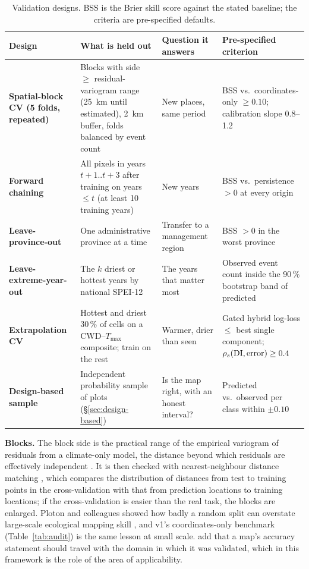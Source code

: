 \begin{table}[t]
\centering
\caption{Validation designs. BSS is the Brier skill score against the stated baseline; the criteria are pre-specified defaults.}\label{tab:cv}
\footnotesize
\begin{tabularx}{\linewidth}{@{}>{\raggedright\arraybackslash\bfseries\sffamily}p{2.55cm}>{\raggedright\arraybackslash}p{4.3cm}>{\raggedright\arraybackslash}p{3.2cm}>{\raggedright\arraybackslash}X@{}}
\toprule
Design & What is held out & Question it answers & Pre-specified criterion\\
\midrule
Spatial-block CV (5 folds, repeated) & Blocks with side $\ge$ residual-variogram range (25~km until estimated), 2~km buffer, folds balanced by event count & New places, same period & BSS vs.\ coordinates-only $\ge0.10$; calibration slope 0.8--1.2\\
Forward chaining & All pixels in years $t{+}1..t{+}3$ after training on years $\le t$ (at least 10 training years) & New years & BSS vs.\ persistence $>0$ at every origin\\
Leave-province-out & One administrative province at a time & Transfer to a management region & BSS $>0$ in the worst province\\
Leave-extreme-year-out & The $k$ driest or hottest years by national SPEI-12 & The years that matter most & Observed event count inside the 90\,\% bootstrap band of predicted\\
Extrapolation CV & Hottest and driest 30\,\% of cells on a CWD--$T_{\max}$ composite; train on the rest & Warmer, drier than seen & Gated hybrid log-loss $\le$ best single component; $\rho_s(\mathrm{DI},\text{error})\ge0.4$\\
Design-based sample & Independent probability sample of plots (\S\ref{sec:design-based}) & Is the map right, with an honest interval? & Predicted vs.\ observed per class within $\pm0.10$\\
\bottomrule
\end{tabularx}
\end{table}

\textbf{Blocks.} The block side is the practical range of the empirical variogram of residuals from a climate-only model, the distance beyond which residuals are effectively independent \citep{Roberts2017,Valavi2019}. It is then checked with nearest-neighbour distance matching \citep{Mila2022}, which compares the distribution of distances from test to training points in the cross-validation with that from prediction locations to training locations; if the cross-validation is easier than the real task, the blocks are enlarged. Ploton and colleagues showed how badly a random split can overstate large-scale ecological mapping skill \citep{Ploton2020}, and v1's coordinates-only benchmark (Table~\ref{tab:audit}) is the same lesson at small scale. \citet{Meyer2022} add that a map's accuracy statement should travel with the domain in which it was validated, which in this framework is the role of the area of applicability.

